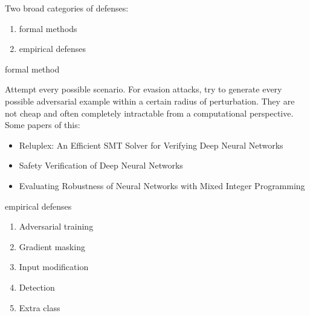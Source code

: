\documentclass[11pt]{article}
\numberwithin{equation}{section}
\begin{document}
Two broad categories of defenses:

\begin{enumerate}
    \item formal methods
    \item empirical defenses
\end{enumerate}

\colorbox{orange!15}{formal method}

Attempt every possible scenario. For evasion attacks, try to generate every possible adversarial example within a certain radius of perturbation. They are not cheap and often completely intractable from a computational perspective. Some papers of this:
\begin{itemize}
    \item Reluplex: An Efficient SMT Solver for Verifying Deep Neural Networks
    \item Safety Verification of Deep Neural Networks
    \item Evaluating Robustness of Neural Networks with Mixed Integer Programming
\end{itemize}

\colorbox{orange!15}{empirical defenses}

\begin{enumerate}
    \item Adversarial training
    \item Gradient masking
    \item Input modification
    \item Detection
    \item Extra class
\end{enumerate}



% 

\end{document}

